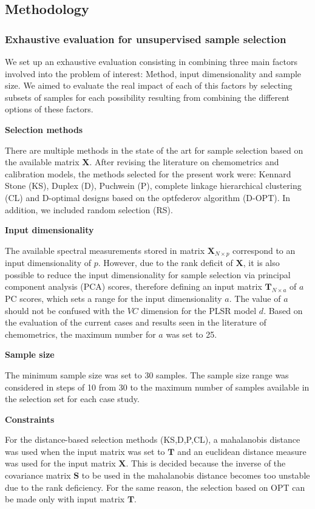 \documentclass{article}
\begin{document}
\subsection*{Methodology}\label{methodology}

\subsubsection*{Exhaustive evaluation for unsupervised sample selection}

We set up an exhaustive evaluation consisting in combining three main factors involved into the problem of interest: Method, input dimensionality and sample size. We aimed to evaluate the real impact of each of this factors by selecting subsets of samples for each possibility resulting from combining the different options of these factors.  

\textbf{Selection methods}

There are multiple methods in the state of the art for sample selection based on the available matrix $\mathbf{X}$. After revising the literature on chemometrics and calibration models, the methods selected for the present work were: Kennard Stone (KS), Duplex (D), Puchwein (P), complete linkage hierarchical clustering (CL) and D-optimal designs based on the optfederov algorithm (D-OPT). In addition, we included random selection (RS). 

\textbf{Input dimensionality}

The available spectral measurements stored in matrix $\mathbf{X}_{N\times p}$ correspond to an input dimensionality of $p$. However, due to the rank deficit of $\mathbf{X}$, it is also possible to reduce the input dimensionality for sample selection via principal component analysis (PCA) scores, therefore defining an input matrix $\mathbf{T}_{N\times a}$ of $a$ PC scores, which sets a range for the input dimensionality $a$. The value of $a$ should not be confused with the $VC$ dimension for the PLSR model $d$. Based on the evaluation of the current cases and results seen in the literature of chemometrics, the maximum number for $a$ was set to 25.

\textbf{Sample size}

The minimum sample size was set to 30 samples. The sample size range was considered in steps of 10 from 30 to the maximum number of samples available in the selection set for each case study. 

\textbf{Constraints}

For the distance-based selection methods (KS,D,P,CL), a mahalanobis distance was used when the input matrix was set to $\mathbf{T}$ and an euclidean distance measure was used for the input matrix $\mathbf{X}$. This is decided because the inverse of the covariance matrix $\mathbf{S}$ to be used in the mahalanobis distance becomes too unstable due to the rank deficiency. For the same reason, the selection based on OPT can be made only with input matrix $\mathbf{T}$. 
\end{document}
